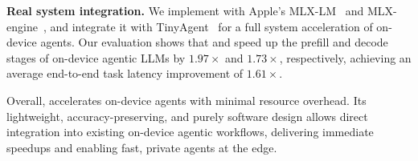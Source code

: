 {\bf Real system integration.} We implement \proposed with Apple's MLX-LM~\cite{mlx_lm} and MLX-engine~\cite{mlx_engine}, and integrate it with TinyAgent~\cite{tinyagent} for a full system acceleration of on-device agents. Our evaluation shows that \prefill and \decode speed up the prefill and decode stages of on-device agentic LLMs by $1.97\times$ and $1.73\times$, respectively, achieving an average end-to-end task latency improvement of $1.61\times$.

Overall, \proposed accelerates on-device agents with minimal resource overhead. Its lightweight, accuracy-preserving, and purely software design allows direct integration into existing on-device agentic workflows, delivering immediate speedups and enabling fast, private agents at the edge.

